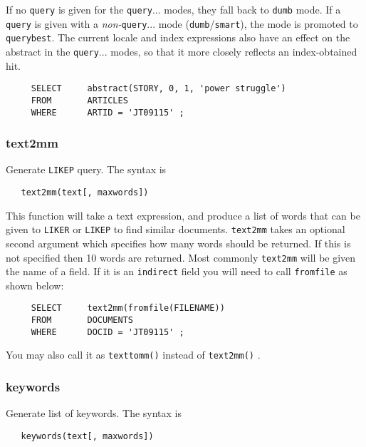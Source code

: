   If no \verb`query` is given for the \verb`query`$...$ modes, they
fall back to \verb`dumb` mode.  If a \verb`query` is given with a {\em
non-}\verb`query`$...$ mode (\verb`dumb`/\verb`smart`), the mode is
promoted to \verb`querybest`.  The current locale and index
expressions also have an effect on the abstract in the
\verb`query`$...$ modes, so that it more closely reflects an
index-obtained hit.

\begin{verbatim}
     SELECT     abstract(STORY, 0, 1, 'power struggle')
     FROM       ARTICLES
     WHERE      ARTID = 'JT09115' ;
\end{verbatim}

\subsubsection{text2mm}

Generate \verb`LIKEP` query.  The syntax is
\begin{verbatim}
   text2mm(text[, maxwords])
\end{verbatim}

This function will take a text expression, and produce a list of words
that can be given to \verb`LIKER` or \verb`LIKEP` to find similar
documents.  \verb`text2mm` takes an optional second argument which
specifies how many words should be returned.  If this is not specified
then 10 words are returned.  Most commonly \verb`text2mm` will be given the
name of a field.  If it is an \verb`indirect` field you will need to call
\verb|fromfile| as shown below:

\begin{verbatim}
     SELECT     text2mm(fromfile(FILENAME))
     FROM       DOCUMENTS
     WHERE      DOCID = 'JT09115' ;
\end{verbatim}

You may also call it as \verb`texttomm()` instead of \verb`text2mm()` .

\subsubsection{keywords}

Generate list of keywords.  The syntax is
\begin{verbatim}
   keywords(text[, maxwords])
\end{verbatim}


